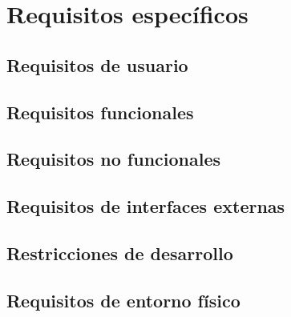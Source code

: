 \chapter{Requisitos específicos}\label{chap:requirements}

\section{Requisitos de usuario}\label{sec:user-req}

\section{Requisitos funcionales}\label{sec:functional-req}

\section{Requisitos no funcionales}\label{sec:non-functional-req}

\section{Requisitos de interfaces externas}\label{sec:external-if-req}

\section{Restricciones de desarrollo}\label{sec:dev-restrictions}

\section{Requisitos de entorno físico}\label{sec:phisical-req}


